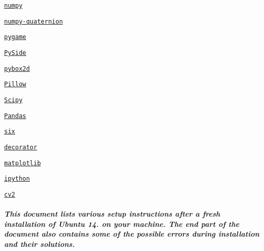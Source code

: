 \begin{DoxyItemize}
\item \href{http://www.numpy.org/}{\tt numpy}
\item \href{https://pypi.python.org/pypi/numpy-quaternion}{\tt numpy-\/quaternion}
\item \href{http://www.pygame.org/download.shtml}{\tt pygame}
\item \href{https://pypi.python.org/pypi/PySide/1.2.4}{\tt Py\-Side}
\item \href{https://github.com/pybox2d/pybox2d}{\tt pybox2d}
\item \href{https://pypi.python.org/pypi/Pillow/4.1.1}{\tt Pillow}
\item \href{https://pypi.python.org/pypi/scipy/0.19.0}{\tt Scipy}
\item \href{https://pandas.pydata.org/}{\tt Pandas}
\item \href{https://pypi.python.org/pypi/six/1.10.0}{\tt six}
\item \href{https://pypi.python.org/pypi/decorator/4.0.11}{\tt decorator}
\item \href{https://pypi.python.org/pypi/matplotlib/2.0.1}{\tt matplotlib}
\item \href{https://pypi.python.org/pypi/ipython/6.0.0}{\tt ipython}
\item \href{https://github.com/opencv/opencv}{\tt cv2}
\end{DoxyItemize}

\subparagraph*{This document lists various setup instructions after a fresh installation of Ubuntu 14. on your machine. The end part of the document also contains some of the possible errors during installation and their solutions.}


